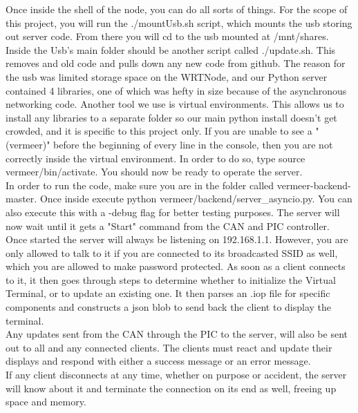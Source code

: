 \documentclass[paper=a4, fontsize=11pt]{scrartcl}
\numberwithin{equation}{section}		%
\numberwithin{figure}{section}			%
\numberwithin{table}{section}				%
\begin{document}
 Once inside the shell of the node, you can do all sorts of things. For the scope of this project, you will run the ./mountUsb.sh script, which mounts the usb storing out server code. From there you will cd to the usb mounted at /mnt/shares. Inside the Usb's main folder should be another script called ./update.sh. This removes and old code and pulls down any new code from github. The reason for the usb was limited storage space on the WRTNode, and our Python server contained 4 libraries, one of which was hefty in size because of the asynchronous networking code. Another tool we use is virtual environments. This allows us to install any libraries to a separate folder so our main python install doesn't get crowded, and it is specific to this project only. If you are unable to see a "(vermeer)" before the beginning of every line in the console, then you are not correctly inside the virtual environment. In order to do so, type source vermeer/bin/activate. You should now be ready to operate the server.\\ 
 In order to run the code, make sure you are in the folder called vermeer-backend-master. Once inside execute python vermeer/backend/server\_asyncio.py. You can also execute this with a -debug flag for better testing purposes. The server will now wait until it gets a "Start" command from the CAN and PIC controller. Once started the server will always be listening on 192.168.1.1. However, you are only allowed to talk to it if you are connected to its broadcasted SSID as well, which you are allowed to make password protected. As soon as a client connects to it, it then goes through steps to determine whether to initialize the Virtual Terminal, or to update an existing one. It then parses an .iop file for specific components and constructs a json blob to send back the client to display the terminal. \\
 
 Any updates sent from the CAN through the PIC to the server, will also be sent out to all and any connected clients. The clients must react and update their displays and respond with either a success message or an error message. \\
 
 If any client disconnects at any time, whether on purpose or accident, the server will know about it and terminate the connection on its end as well, freeing up space and memory. \\
\end{document}

